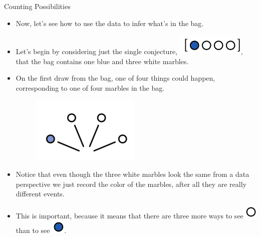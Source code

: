 \documentclass[handout]{beamer}
\begin{document}
\begin{frame}{Counting Possibilities}
\scriptsize{
\begin{itemize}
 \item Now, let's see how to use the data to infer what's in the bag.
 \item Let's begin by considering just the single conjecture, \includegraphics[scale=0.3]{pics/marbles3.png}, that the bag contains one blue and three white marbles. 
 \item On the first draw from the bag, one of four things could
happen, corresponding to one of four marbles in the bag.

\begin{figure}[h!]
	\centering
	\includegraphics[scale=0.4]{pics/marbles4.png}
\end{figure}

\item Notice that even though the three white marbles look the same from a data perspective we just record the color of the marbles, after all they are really different events.

\item This is important, because it means that there are three more ways to see \includegraphics[scale=0.3]{pics/marbles5.png} than to see \includegraphics[scale=0.3]{pics/marbles6.png}.

\end{itemize}
 } 
\end{frame}
\end{document}
